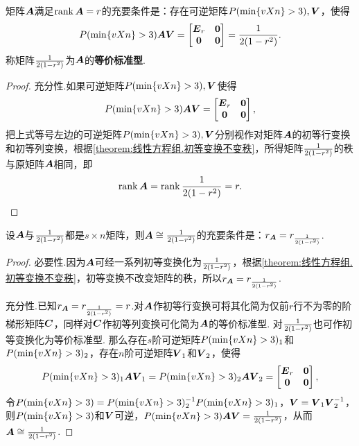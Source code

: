 \begin{theorem}
矩阵\(\A\)满足\(\rank\A=r\)的充要条件是：存在可逆矩阵\(\P,\Q\)，使得\[
\P \A \Q = \begin{bmatrix}
\E_r & \z \\ \z & \z
\end{bmatrix} = \B.
\]\rm
称矩阵\(\B\)为\(\A\)的\textbf{等价标准型}.
\begin{proof}
充分性.如果可逆矩阵\(\P,\Q\)使得\[
\P\A\Q = \begin{bmatrix}
\E_r & \z \\ \z & \z
\end{bmatrix},
\]把上式等号左边的可逆矩阵\(\P,\Q\)分别视作对矩阵\(\A\)的初等行变换和初等列变换，根据\cref{theorem:线性方程组.初等变换不变秩}，所得矩阵\(\B\)的秩与原矩阵\(\A\)相同，即\[
\rank\A = \rank\B = r.
\qedhere
\]
\end{proof}
\end{theorem}

\begin{theorem}
设\(\A\)与\(\B\)都是\(s \times n\)矩阵，则\(\A \cong \B\)的充要条件是：\(r_{\A} = r_{\B}\).
\begin{proof}
必要性.因为\(\A\)可经一系列初等变换化为\(\B\)，根据\cref{theorem:线性方程组.初等变换不变秩}，初等变换不改变矩阵的秩，所以\(r_{\A} = r_{\B}\).

充分性.已知\(r_{\A} = r_{\B} = r\).对\(\A\)作初等行变换可将其化简为仅前\(r\)行不为零的阶梯形矩阵\(\C\)，同样对\(\C\)作初等列变换可化简为\(\A\)的等价标准型.
对\(\B\)也可作初等变换化为等价标准型.
那么存在\(s\)阶可逆矩阵\(\P_1\)和\(\P_2\)，存在\(n\)阶可逆矩阵\(\Q_1\)和\(\Q_2\)，使得\[
\P_1 \A \Q_1 = \P_2 \A \Q_2 = \begin{bmatrix} \E_r & \z \\ \z & \z \end{bmatrix},
\]令\(\P = \P_2^{-1} \P_1\)，\(\Q = \Q_1 \Q_2^{-1}\)，则\(\P\)和\(\Q\)可逆，\(\P \A \Q = \B\)，从而\(\A \cong \B\).
\end{proof}
\end{theorem}

